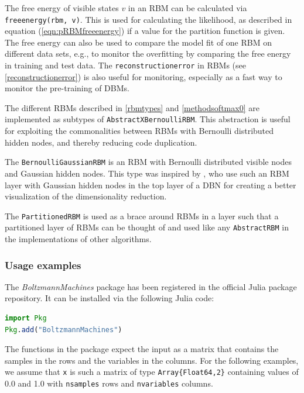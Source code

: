 \documentclass[12pt]{article}
\newcommand{\inlinecode}[1]{\texttt{#1}}
\newcommand{\apkg}[1]{\emph{#1}}
\begin{document}
The free energy of visible states $v$ in an RBM can be calculated via  \inlinecode{freeenergy(rbm, v)}.
This is used for calculating the likelihood, as described in equation (\ref{eqn:pRBMfreeenergy}) if a value for the partition function is given.
The free energy can also be used to compare the model fit of one RBM on different data sets, e.g., to monitor the overfitting by comparing the free energy in training and test data.
The \inlinecode{reconstructionerror} in RBMs (see \ref{reconstructionerror}) is also useful for monitoring, especially as a fast way to monitor the pre-training of DBMs.

The different RBMs described in \ref{rbmtypes} and \ref{methodsoftmax0} are implemented as subtypes of \inlinecode{AbstractXBernoulliRBM}.
This abstraction is useful for exploiting the commonalities between RBMs with Bernoulli distributed hidden nodes, and thereby reducing code duplication.

The \inlinecode{BernoulliGaussianRBM} is an RBM with Bernoulli distributed visible nodes and Gaussian hidden nodes.
This type was inspired by \cite{hinton_reducing_2006}, who use such an RBM layer with Gaussian hidden nodes in the top layer of a DBN for creating a better visualization of the dimensionality reduction.

The \inlinecode{PartitionedRBM} is used as a brace around RBMs in a layer such that a partitioned layer of RBMs can be thought of and used like any \inlinecode{AbstractRBM} in the implementations of other algorithms.



\subsubsection{Usage examples}
The \apkg{BoltzmannMachines} package has been registered in the official Julia package repository. It can be installed via the following Julia code:

\begin{lstlisting}[language=Julia]
import Pkg
Pkg.add("BoltzmannMachines")
\end{lstlisting}

The functions in the package expect the input as a matrix that contains the samples in the rows and the variables in the columns.
For the following examples, we assume that \inlinecode{x} is such a matrix of type \inlinecode{Array\{Float64,2\}} containing values of 0.0 and 1.0 with \inlinecode{nsamples} rows and \inlinecode{nvariables} columns.
\end{document}
